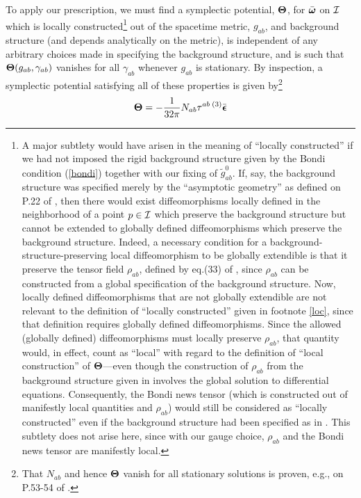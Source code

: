 To apply our prescription, we must find a symplectic potential,
${\mbox{\boldmath $\Theta$}}$, for $\bar{\mbox{\boldmath $\omega$}}$
on ${\cal I}$ which is locally constructed\footnote{A major subtlety
would have arisen in the meaning of ``locally constructed'' if we had
not imposed the rigid background structure given by the Bondi
condition (\ref{bondi}) together with our fixing of
$\tilde{g}^0_{ab}$. If, say, the background structure was specified
merely by the ``asymptotic geometry'' as defined on P.22 of \cite{g},
then there would exist diffeomorphisms locally defined in the
neighborhood of a point $p \in {\cal I}$ which preserve the background
structure but cannot be extended to globally defined diffeomorphisms
which preserve the background structure. Indeed, a necessary condition
for a background-structure-preserving local diffeomorphism to be
globally extendible is that it preserve the tensor field $\rho_{ab}$,
defined by eq.(33) of \cite{g}, since $\rho_{ab}$ can be constructed
from a global specification of the background structure. Now, locally
defined diffeomorphisms that are not globally extendible are not
relevant to the definition of ``locally constructed'' given in
footnote \ref{loc}, since that definition requires globally defined
diffeomorphisms. Since the allowed (globally defined) diffeomorphisms
must locally preserve $\rho_{ab}$, that quantity would, in effect,
count as ``local'' with regard to the definition of ``local
construction'' of ${\mbox{\boldmath $\Theta$}}$---even though the
construction of $\rho_{ab}$ from the background structure given in
\cite{g} involves the global solution to differential
equations. Consequently, the Bondi news tensor (which is constructed
out of manifestly local quantities and $\rho_{ab}$) would still be
considered as ``locally constructed'' even if the background structure
had been specified as in \cite{g}. This subtlety does not arise here,
since with our gauge choice, $\rho_{ab}$ and the Bondi news tensor are
manifestly local.} out of the spacetime metric, $g_{ab}$, and
background structure (and depends analytically on the metric), is
independent of any arbitrary choices made in specifying the background
structure, and is such that ${\mbox{\boldmath $\Theta$}}(g_{ab},
\gamma_{ab})$ vanishes for all $\gamma_{ab}$ whenever $g_{ab}$ is
stationary. By inspection, a symplectic potential satisfying all of
these properties is given by\footnote{That $N_{ab}$ and hence
${\mbox{\boldmath $\Theta$}}$ vanish for all stationary solutions is
proven, e.g., on P.53-54 of \cite{g}.}
\begin{equation}
{\mbox{\boldmath $\Theta$}} = - \frac{1}{32 \pi} N_{ab} \tau^{ab} \,
{}^{(3)} \bar{\mbox{\boldmath $\epsilon$}}
\label{Thetascri}
\end{equation}

